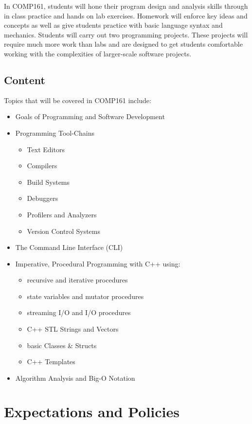 \documentclass[10pt]{article}
\begin{document}
In COMP161, students will hone their program design and analysis skills through in class practice and hands on lab exercises.  Homework will enforce key ideas and concepts as well as give students practice with basic language syntax and mechanics.  Students will carry out two programming projects.  These projects will require much more work than labs and are designed to get students comfortable working with the complexities of larger-scale software projects.

\subsection{Content}

Topics that will be covered in COMP161 include:
\begin{itemize}
\item Goals of Programming and Software Development
\item Programming Tool-Chains
\begin{itemize}
\item Text Editors
\item Compilers
\item Build Systems
\item Debuggers
\item Profilers and Analyzers
\item Version Control Systems
\end{itemize}
\item The Command Line Interface (CLI)
\item Imperative, Procedural Programming with C++ using:
\begin{itemize}
\item recursive and iterative procedures
\item state variables and mutator procedures
\item streaming I/O and I/O procedures
\item C++ STL Strings and Vectors
\item basic Classes \& Structs
\item C++ Templates
\end{itemize}
\item Algorithm Analysis and Big-O Notation
\end{itemize}

\section{Expectations and Policies}
\end{document}
